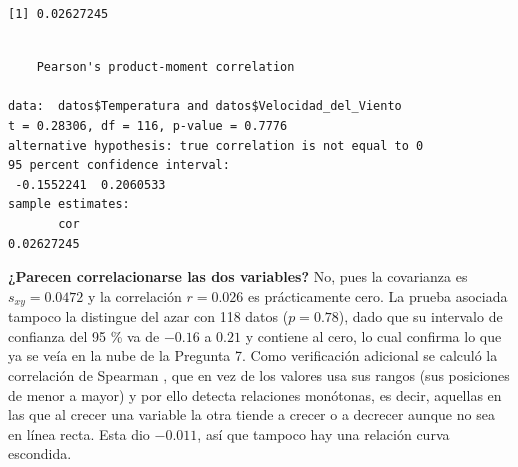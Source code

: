 \documentclass[oneside, openany, fontset=libertinus]{mitthesis}
\newenvironment{Shaded}{\begin{snugshade}}{\end{snugshade}}
\newcommand{\FunctionTok}[1]{\textcolor[rgb]{0.28,0.35,0.67}{#1}}
\newcommand{\NormalTok}[1]{\textcolor[rgb]{0.00,0.23,0.31}{#1}}
\newcommand{\SpecialCharTok}[1]{\textcolor[rgb]{0.37,0.37,0.37}{#1}}
\newenvironment{codres}%
  {\par\smallskip\noindent\begin{minipage}[t]{0.57\linewidth}\vspace{0pt}}%
  {\end{minipage}\par\medskip}
\newcommand{\codressep}{\end{minipage}\hfill\begin{minipage}[t]{0.40\linewidth}\vspace{0pt}}
\begin{document}
\begin{codres}

\begin{Shaded}
\end{Shaded}

\codressep

\begin{verbatim}
[1] 0.02627245
\end{verbatim}

\end{codres}

\begin{Shaded}
\end{Shaded}

\begin{verbatim}

    Pearson's product-moment correlation

data:  datos$Temperatura and datos$Velocidad_del_Viento
t = 0.28306, df = 116, p-value = 0.7776
alternative hypothesis: true correlation is not equal to 0
95 percent confidence interval:
 -0.1552241  0.2060533
sample estimates:
       cor 
0.02627245 
\end{verbatim}

\textbf{¿Parecen correlacionarse las dos variables?} No, pues la
covarianza es \(s_{xy} = 0.0472\) y la correlación \(r = 0.026\) es
prácticamente cero. La prueba asociada tampoco la distingue del azar con
118 datos (\(p = 0.78\)), dado que su intervalo de confianza del 95 \%
va de \(-0.16\) a \(0.21\) y contiene al cero, lo cual confirma lo que
ya se veía en la nube de la Pregunta 7. Como verificación adicional se
calculó la correlación de Spearman \parencite{spearman1904}, que en vez
de los valores usa sus rangos (sus posiciones de menor a mayor) y por
ello detecta relaciones monótonas, es decir, aquellas en las que al
crecer una variable la otra tiende a crecer o a decrecer aunque no sea
en línea recta. Esta dio \(-0.011\), así que tampoco hay una relación
curva escondida.
\end{document}
